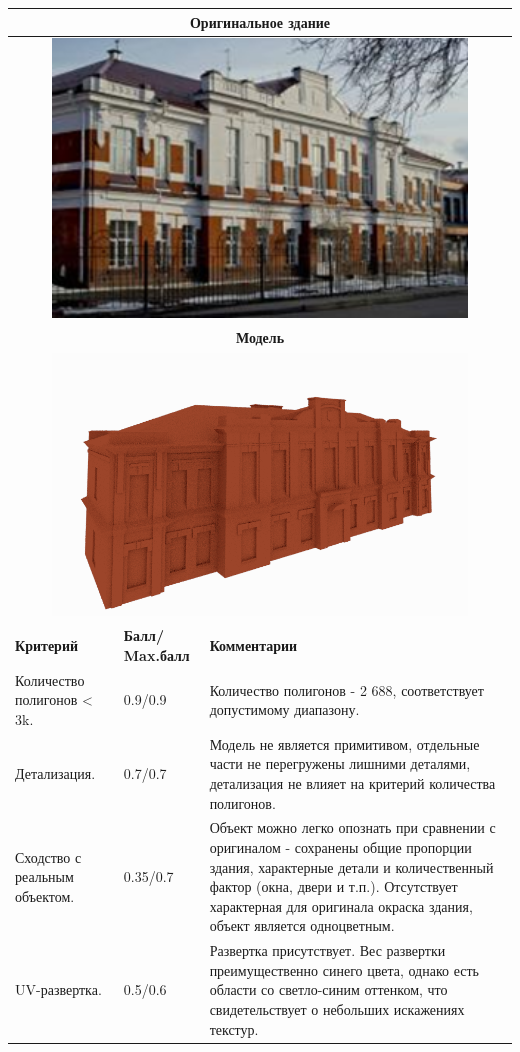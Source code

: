 \begin{longtable}{|p{4cm}|p{2.5cm}|p{7.5cm}|}
    \hline
    \multicolumn{3}{|c|}{\textbf{Оригинальное здание} } \\
    \hline
    \multicolumn{3}{|c|}{\includegraphics[width=11cm]{10}} \\
    \hline
    \multicolumn{3}{|c|}{\textbf{Модель}} \\
    \hline
    \multicolumn{3}{|c|}{\includegraphics[width=11cm]{src/model_8}} \\
    \hline
    \textbf{Критерий} & \textbf{Балл/ Max.балл} & \textbf{Комментарии} \\
    \hline
    Количество полигонов < 3k. & 0.9/0.9 & Количество полигонов - 2 688, соответствует допустимому диапазону. \\
    \hline
    Детализация. & 0.7/0.7 & Модель не является примитивом, отдельные части не перегружены лишними деталями, детализация не влияет на критерий количества полигонов. \\
    \hline
    Сходство с реальным объектом. & 0.35/0.7 & Объект можно легко опознать при сравнении с оригиналом - сохранены общие пропорции здания, характерные детали и количественный фактор (окна, двери и т.п.). Отсутствует характерная для оригинала окраска здания, объект является одноцветным. \\
    \hline
    UV-развертка. & 0.5/0.6 & Развертка присутствует. Вес развертки преимущественно синего цвета, однако есть области со светло-синим оттенком, что свидетельствует о небольших искажениях текстур.


\end{longtable}
